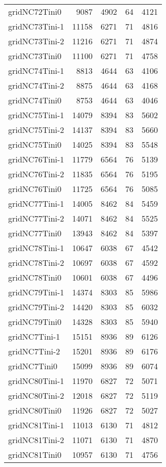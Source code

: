 \begin{longtable}{lrrrr}
gridNC72Tini0 & 9087 & 4902 & 64 & 4121 \\
gridNC73Tini-1 & 11158 & 6271 & 71 & 4816 \\
gridNC73Tini-2 & 11216 & 6271 & 71 & 4874 \\
gridNC73Tini0 & 11100 & 6271 & 71 & 4758 \\
gridNC74Tini-1 & 8813 & 4644 & 63 & 4106 \\
gridNC74Tini-2 & 8875 & 4644 & 63 & 4168 \\
gridNC74Tini0 & 8753 & 4644 & 63 & 4046 \\
gridNC75Tini-1 & 14079 & 8394 & 83 & 5602 \\
gridNC75Tini-2 & 14137 & 8394 & 83 & 5660 \\
gridNC75Tini0 & 14025 & 8394 & 83 & 5548 \\
gridNC76Tini-1 & 11779 & 6564 & 76 & 5139 \\
gridNC76Tini-2 & 11835 & 6564 & 76 & 5195 \\
gridNC76Tini0 & 11725 & 6564 & 76 & 5085 \\
gridNC77Tini-1 & 14005 & 8462 & 84 & 5459 \\
gridNC77Tini-2 & 14071 & 8462 & 84 & 5525 \\
gridNC77Tini0 & 13943 & 8462 & 84 & 5397 \\
gridNC78Tini-1 & 10647 & 6038 & 67 & 4542 \\
gridNC78Tini-2 & 10697 & 6038 & 67 & 4592 \\
gridNC78Tini0 & 10601 & 6038 & 67 & 4496 \\
gridNC79Tini-1 & 14374 & 8303 & 85 & 5986 \\
gridNC79Tini-2 & 14420 & 8303 & 85 & 6032 \\
gridNC79Tini0 & 14328 & 8303 & 85 & 5940 \\
gridNC7Tini-1 & 15151 & 8936 & 89 & 6126 \\
gridNC7Tini-2 & 15201 & 8936 & 89 & 6176 \\
gridNC7Tini0 & 15099 & 8936 & 89 & 6074 \\
gridNC80Tini-1 & 11970 & 6827 & 72 & 5071 \\
gridNC80Tini-2 & 12018 & 6827 & 72 & 5119 \\
gridNC80Tini0 & 11926 & 6827 & 72 & 5027 \\
gridNC81Tini-1 & 11013 & 6130 & 71 & 4812 \\
gridNC81Tini-2 & 11071 & 6130 & 71 & 4870 \\
gridNC81Tini0 & 10957 & 6130 & 71 & 4756 \\

\end{longtable}
